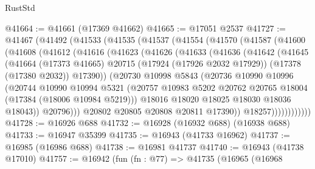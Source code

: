 \begin{lexlean}{RustStd}
\begin{coremodule}
@41664 := @41661 (@17369 @41662)
@41665 := @17051 @2537
@41727 := @41467
    (@41492
      (@41533
        (@41535
          (@41537
            (@41554
              (@41570
                (@41587
                  (@41600
                    (@41608
                      (@41612
                        (@41616
                          (@41623
                            (@41626
                              (@41633
                                (@41636
                                  (@41642
                                    (@41645
                                      (@41664
                                        (@17373 @41665)
                                        @20715
                                        (@17924 (@17926 @2032 @17929))
                                        (@17378 (@17380 @2032))
                                        @17390))
                                    (@20730
                                      @10998
                                      @5843
                                      (@20736
                                        @10990
                                        @10996
                                        (@20744
                                          @10990
                                          @10994
                                          @5321
                                          (@20757
                                            @10983
                                            @5202
                                            @20762
                                            @20765
                                            @18004
                                            (@17384 (@18006 @10984 @5219)))
                                          @18016
                                          @18020
                                          @18025
                                          @18030
                                          @18036
                                          @18043))
                                      @20796)))
                                @20802
                                @20805
                                @20808
                                @20811
                                @17390))
                            @18257))))))))))))
@41728 := @16926 @688
@41732 := @16928 (@16932 @688) (@16938 @688)
@41733 := @16947 @35399
@41735 := @16943 (@41733 @16962)
@41737 := @16985 (@16986 @688)
@41738 := @16981 @41737
@41740 := @16943 (@41738 @17010)
@41757 := @16942
    (fun (fn : @77) =>
    @41735
      (@16965
        (@16968

\end{coremodule}
\end{lexlean}
